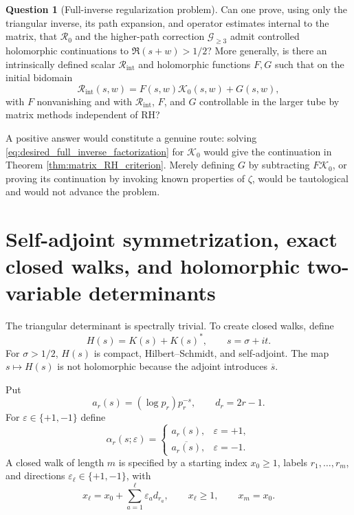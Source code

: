 \documentclass[11pt]{amsart}
\numberwithin{equation}{section}
\theoremstyle{plain}
\theoremstyle{definition}
\newtheorem{question}[theorem]{Question}
\theoremstyle{remark}
\begin{document}
\begin{question}[Full-inverse regularization problem]
\label{question:full_inverse_regularization}
Can one prove, using only the triangular inverse, its path expansion, and operator estimates internal to the matrix, that $\mathcal R_0$ and the higher-path correction $\mathcal G_{\ge3}$ admit controlled holomorphic continuations to $\Re(s+w)>1/2$?  More generally, is there an intrinsically defined scalar $\mathcal R_{\mathrm{int}}$ and holomorphic functions $F,G$ such that on the initial bidomain
\begin{equation}
\mathcal R_{\mathrm{int}}(s,w)
=F(s,w)\mathcal K_0(s,w)+G(s,w),
\label{eq:desired_full_inverse_factorization}
\end{equation}
with $F$ nonvanishing and with $\mathcal R_{\mathrm{int}}$, $F$, and $G$ controllable in the larger tube by matrix methods independent of RH?
\end{question}

A positive answer would constitute a genuine route: solving \eqref{eq:desired_full_inverse_factorization} for $\mathcal K_0$ would give the continuation in Theorem \ref{thm:matrix_RH_criterion}.  Merely defining $G$ by subtracting $F\mathcal K_0$, or proving its continuation by invoking known properties of $\zeta$, would be tautological and would not advance the problem.


\section{Self-adjoint symmetrization, exact closed walks, and holomorphic two-variable determinants}
\label{sec:selfadjoint_closure}

The triangular determinant is spectrally trivial.  To create closed walks, define
\begin{equation}
H(s)=K(s)+K(s)^*,
\qquad s=\sigma+it.
\label{eq:H_definition}
\end{equation}
For $\sigma>1/2$, $H(s)$ is compact, Hilbert--Schmidt, and self-adjoint.  The map $s\mapsto H(s)$ is not holomorphic because the adjoint introduces $\overline s$.

Put
\begin{equation}
a_r(s)=(\log p_r)p_r^{-s},
\qquad d_r=2r-1.
\label{eq:edge_amplitude}
\end{equation}
For $\varepsilon\in\{+1,-1\}$ define
\begin{equation}
\alpha_r(s;\varepsilon)=
\begin{cases}
a_r(s),&\varepsilon=+1,\\
\overline{a_r(s)},&\varepsilon=-1.
\end{cases}
\label{eq:directional_amplitude}
\end{equation}
A closed walk of length $m$ is specified by a starting index $x_0\ge1$, labels $r_1,\ldots,r_m$, and directions $\varepsilon_\ell\in\{+1,-1\}$, with
\begin{equation}
x_\ell=x_0+\sum_{a=1}^{\ell}\varepsilon_a d_{r_a},
\qquad x_\ell\ge1,
\qquad x_m=x_0.
\label{eq:closed_walk_positions}
\end{equation}
\end{document}

